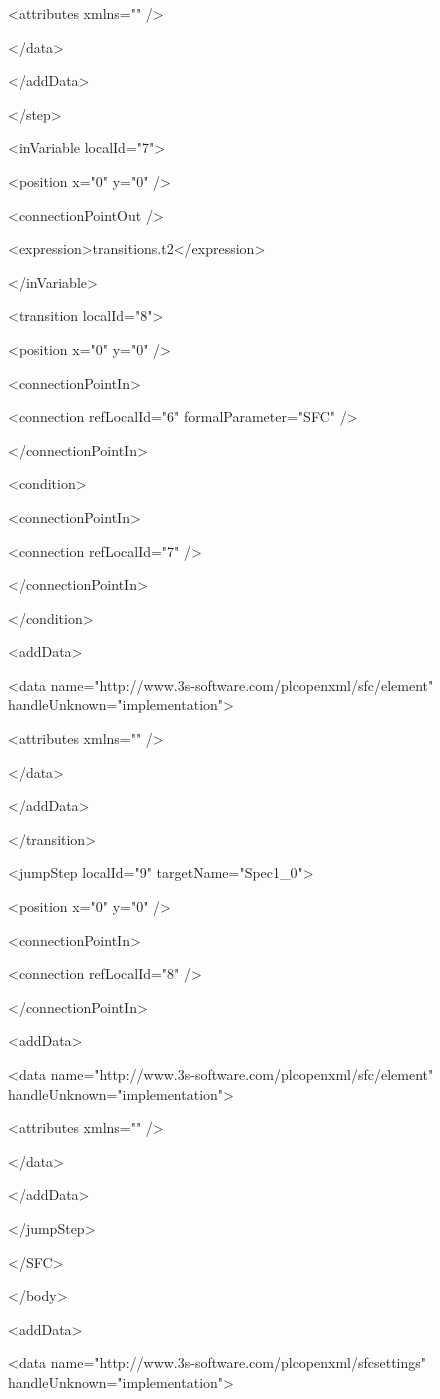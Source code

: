 {    <attributes xmlns="" />

   </data>

  </addData>

 </step>

 <inVariable localId="7">

  <position x="0" y="0" />

  <connectionPointOut />

  <expression>transitions.t2</expression>

 </inVariable>

 <transition localId="8">

  <position x="0" y="0" />

  <connectionPointIn>

   <connection refLocalId="6" formalParameter="SFC" />

  </connectionPointIn>

  <condition>

   <connectionPointIn>

    <connection refLocalId="7" />

   </connectionPointIn>

  </condition>

  <addData>

   <data name="http://www.3s-software.com/plcopenxml/sfc/element" handleUnknown="implementation">

    <attributes xmlns="" />

   </data>

  </addData>

 </transition>

 <jumpStep localId="9" targetName="Spec1\_0">

  <position x="0" y="0" />

  <connectionPointIn>

   <connection refLocalId="8" />

  </connectionPointIn>

  <addData>

   <data name="http://www.3s-software.com/plcopenxml/sfc/element" handleUnknown="implementation">

    <attributes xmlns="" />

   </data>

  </addData>

 </jumpStep>

</SFC>

</body>

<addData>

<data name="http://www.3s-software.com/plcopenxml/sfcsettings" handleUnknown="implementation">

}
